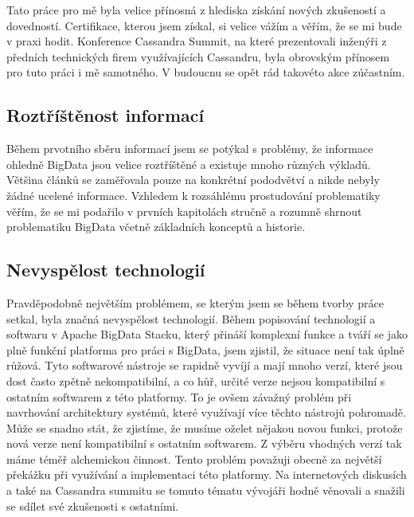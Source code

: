 Tato práce pro mě byla velice přínosná z hlediska získání nových zkušeností a dovedností. Certifikace, kterou jsem získal, si velice vážím a věřím, že se mi bude v praxi hodit. Konference Cassandra Summit, na které prezentovali inženýři z předních technických firem využívajících Cassandru, byla obrovským přínosem pro tuto práci i mě samotného. V budoucnu se opět rád takovéto akce zúčastním. 

\subsection{Roztříštěnost informací}
Během prvotního sběru informací jsem se potýkal s problémy, že informace ohledně BigData jsou velice roztříštěné a existuje mnoho různých výkladů. Většina článků se zaměřovala pouze na konkrétní pododvětví a nikde nebyly žádné ucelené informace. Vzhledem k rozsáhlému prostudování problematiky věřím, že se mi podařilo v prvních kapitolách stručně a rozumně shrnout problematiku BigData včetně základních konceptů a historie. 

\subsection{Nevyspělost technologií}
Pravděpodobně největším problémem, se kterým jsem se během tvorby práce setkal, byla značná nevyspělost technologií. Během popisování technologií a softwaru v Apache BigData Stacku, který přináší komplexní funkce a tváří se jako plně funkční platforma pro práci s BigData, jsem zjistil, že situace není tak úplně růžová. Tyto softwarové nástroje se rapidně vyvíjí a mají mnoho verzí, které jsou dost často zpětně nekompatibilní, a co hůř, určité verze nejsou kompatibilní s ostatním softwarem z této platformy. To je ovšem závažný problém při navrhování architektury systémů, které využívají více těchto nástrojů pohromadě. Může se snadno stát, že zjistíme, že musíme oželet nějakou novou funkci, protože nová verze není kompatibilní s ostatním softwarem. Z výběru vhodných verzí tak máme téměř alchemickou činnost. Tento problém považuji obecně za největší překážku při využívání a implementaci této platformy. Na internetových diskusích a také na Cassandra summitu se tomuto tématu vývojáři hodně věnovali a snažili se sdílet své zkušenosti s ostatními.  

